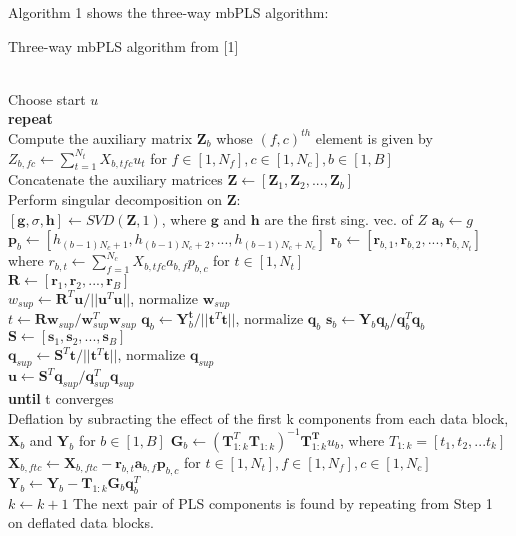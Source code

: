 \documentclass[11pt]{article}
\begin{document}
Algorithm 1 shows the three-way mbPLS algorithm:
\begin{algorithm}
\caption{Three-way mbPLS algorithm from [1]}
\label{threewaymbPLS}
\begin{algorithmic}[1]
\\Choose start $u$
\\\textbf{repeat}
\\Compute the auxiliary matrix $\textbf{Z}_b$ whose $(f,c)^{th}$ element is given by $Z_{b,fc} \leftarrow \sum_{t=1}^{N_t} X_{b,tfc}u_t$ for $f \in [1,N_f], c \in [1,N_c], b \in [1,B]$
\\Concatenate the auxiliary matrices $\textbf{Z} \leftarrow [\textbf{Z}_1, \textbf{Z}_2, ..., \textbf{Z}_b]$
\\Perform singular decomposition on \textbf{Z}:
\\$[\textbf{g},\sigma,\textbf{h}] \leftarrow SVD(\textbf{Z},1)$, where $\textbf{g}$ and $\textbf{h}$ are the first sing. vec. of $Z$
\State$\textbf{a}_b \leftarrow g$
\State$\textbf{p}_b \leftarrow [h_{(b-1)N_c+1}, h_{(b-1)N_c+2}, ..., h_{(b-1)N_c+N_c}]$
\State$\textbf{r}_b \leftarrow [\textbf{r}_{b,1}, \textbf{r}_{b,2}, ..., \textbf{r}_{b,N_t}]$ where $r_{b,t} \leftarrow \sum_{f=1}^{N_c} X_{b,tfc}a_{b,f}p_{b,c}$ for $t \in [1,N_t]$
\EndFor
\\$\textbf{R} \leftarrow [\textbf{r}_1, \textbf{r}_2, ..., \textbf{r}_B]$
\\$w_{sup} \leftarrow \textbf{R}^T \textbf{u} / ||\textbf{u}^T \textbf{u}||$, normalize $\textbf{w}_{sup}$
\\$t \leftarrow \textbf{R} \textbf{w}_{sup} / \textbf{w}_{sup}^T \textbf{w}_{sup}$
\State$\textbf{q}_b \leftarrow \textbf{Y}_b^ \textbf{t} / ||\textbf{t}^T \textbf{t}||$, normalize $\textbf{q}_b$
\State$\textbf{s}_b \leftarrow \textbf{Y}_b \textbf{q}_b / \textbf{q}_b^T \textbf{q}_b$
\EndFor
\\$\textbf{S} \leftarrow [\textbf{s}_1, \textbf{s}_2, ..., \textbf{s}_B]$
\\$\textbf{q}_{sup} \leftarrow \textbf{S}^T \textbf{t} / ||\textbf{t}^T \textbf{t}||$, normalize $\textbf{q}_{sup}$
\\$\textbf{u} \leftarrow \textbf{S}^T \textbf{q}_{sup} / \textbf{q}_{sup}^T \textbf{q}_{sup}$
\\\textbf{until} t converges
\\Deflation by subracting the effect of the first k components from each data block, $\textbf{X}_b$ and $\textbf{Y}_b$ for $b \in [1,B]$
\State$\textbf{G}_b \leftarrow (\textbf{T}_{1:k}^T \textbf{T}_{1:k})^{-1}\textbf{T}_{1:k}^\textbf{T} u_b$, where $T_{1:k} = [t_1, t_2, ... t_k]$
\State$\textbf{X}_{b,ftc} \leftarrow \textbf{X}_{b,ftc} - \textbf{r}_{b,t}\textbf{a}_{b,f}\textbf{p}_{b,c}$ for $t \in [1,N_t], f \in [1,N_f], c \in [1,N_c]$
\State$\textbf{Y}_b \leftarrow \textbf{Y}_b - \textbf{T}_{1:k}\textbf{G}_b \textbf{q}_b^T$
\EndFor
\\$k \leftarrow k + 1$ The next pair of PLS components is found by repeating from Step 1 on deflated data blocks.
\end{algorithmic}
\end{algorithm}
\end{document}
